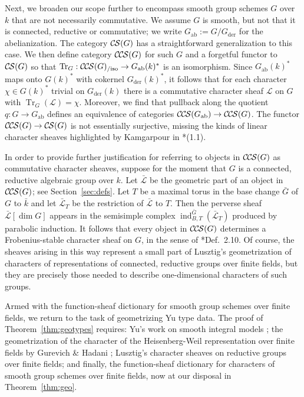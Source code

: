 \documentclass[10pt]{amsart}
\theoremstyle{plain}
\theoremstyle{definition}
\newcommand{\Fq}{k}
\newcommand{\der}{_{\operatorname{der}}}
\newcommand{\ab}{_{\operatorname{ab}}}
\DeclareMathOperator{\Tr}{Tr}
\newcommand{\TrFrob}[1]{\Tr_{#1}}
\newcommand{\cs}[1]{{\mathcal{#1}}}
\newcommand{\gcs}[1]{{\mathcal{\bar #1}}}
\newcommand{\CS}{{\mathcal{C\hskip-0.8pt S}}}
\newcommand{\CCS}{{\mathcal{C\hskip-.8pt C\hskip-0.8pt S}}}
\newcommand{\CCSiso}[1]{\CCS(#1)_{/\text{iso}}}
\newcommand{\bG}{\bar{G}}
\begin{document}
Next, we broaden our scope further to encompass smooth group schemes $G$ over $\Fq$ that are not necessarily commutative.
We assume $G$ is smooth, but not that it is connected, reductive or commutative; we write $G\ab := G/G\der$ for the abelianization.
The category $\CS(G)$ has a straightforward generalization to this case.
We then define category $\CCS(G)$ for such $G$ and a forgetful functor to $\CS(G)$ so that $\TrFrob{G} : \CCSiso{G} \to G\ab(k)^*$
is an isomorphism.  
Since $G\ab(k)^*$ maps onto $G(k)^*$ with cokernel $G\der(k)^*$, it follows that for each character $\chi \in G(k)^*$ trivial on $G\der(k)$ there is a commutative
character sheaf $\cs{L}$ on $G$ with $\TrFrob{G}(\cs{L}) = \chi$. Moreover, we find that pullback along the quotient $q : G \to G\ab$
defines an equivalence of categories $\CCS(G\ab) \to \CCS(G)$.  
The functor $\CCS(G) \to \CS(G)$ is not
essentially surjective, missing the kinds of linear character sheaves highlighted by Kamgarpour in \cite{kamgarpour:09a}*{(1.1)}.

In order to provide further justification for referring to objects in $\CCS(G)$ as commutative character sheaves, suppose for the moment that $G$ is a connected, reductive algebraic group over $\Fq$.
Let $\gcs{L}$ be the geometric part of an object in $\CCS(G)$; see Section~\ref{sec:defs}.
Let $T$ be a maximal torus in the base change $\bG$ of $G$ to $\bar{k}$ and let $\gcs{L}_T$ be the restriction of $\gcs{L}$ to $T$.
Then the perverse sheaf $\gcs{L}[\dim G]$ appears in the semisimple complex $\operatorname{ind}_{B,T}^{\bG}(\gcs{L}_T)$ produced by parabolic induction.
It follows that every object in $\CCS(G)$ determines a Frobenius-stable character sheaf on $G$, in the sense of \cite{lusztig:85a}*{Def.~2.10}. 
Of course, the sheaves arising in this way represent a small part of Lusztig's geometrization of characters of representations of connected, reductive groups over finite fields, but they are precisely those needed to describe one-dimensional characters of such groups. 

Armed with the function-sheaf dictionary for smooth group schemes over finite fields, we return to the task of geometrizing Yu type data. 
The proof of Theorem~\ref{thm:geotypes} requires: Yu's work on smooth integral models \cite{Yu:models}; the geometrization of the character of the Heisenberg-Weil representation over finite fields by Gurevich \& Hadani \cite{gurevich-hadani:07a}; Lusztig's character sheaves on reductive groups over finite fields; and finally, the function-sheaf dictionary for characters of smooth group schemes over finite fields, now at our disposal in Theorem~\ref{thm:geo}.
\end{document}
